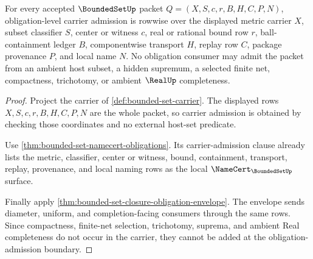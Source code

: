 \begin{theorem}
\label{thm:boundedset-obligation-carrier}
For every accepted $\BoundedSetUp$ packet $Q=(X,S,c,r,B,H,C,P,N)$, obligation-level carrier admission is rowwise over the displayed metric carrier $X$, subset classifier $S$, center or witness $c$, real or rational bound row $r$, ball-containment ledger $B$, componentwise transport $H$, replay row $C$, package provenance $P$, and local name $N$. No obligation consumer may admit the packet from an ambient host subset, a hidden supremum, a selected finite net, compactness, trichotomy, or ambient $\RealUp$ completeness.
\end{theorem}
\begin{proof}
Project the carrier of \autoref{def:bounded-set-carrier}. The displayed rows $X,S,c,r,B,H,C,P,N$ are the whole packet, so carrier admission is obtained by checking those coordinates and no external host-set predicate.

Use \autoref{thm:bounded-set-namecert-obligations}. Its carrier-admission clause already lists the metric, classifier, center or witness, bound, containment, transport, replay, provenance, and local naming rows as the local $\NameCert_{\BoundedSetUp}$ surface.

Finally apply \autoref{thm:bounded-set-closure-obligation-envelope}. The envelope sends diameter, uniform, and completion-facing consumers through the same rows. Since compactness, finite-net selection, trichotomy, suprema, and ambient Real completeness do not occur in the carrier, they cannot be added at the obligation-admission boundary.
\end{proof}

